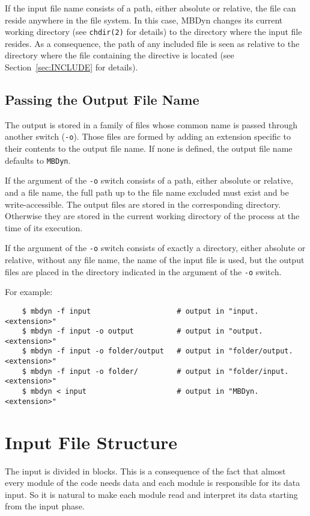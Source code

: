 If the input file name consists of a path, either absolute or relative,
the file can reside anywhere in the file system.
In this case, MBDyn changes its current working directory
(see \texttt{chdir(2)} for details)
to the directory where the input file resides.
As a consequence, the path of any included file is seen as relative
to the directory where the file containing the  directive
is located (see Section~\ref{sec:INCLUDE} for details).



\subsection{Passing the Output File Name}
The output is stored in a family of files whose common name is passed
through another switch (\texttt{-o}).
Those files are formed by adding an extension specific to their contents
to the output file name.
If none is defined, the output file name defaults to \texttt{MBDyn}.

If the argument of the \texttt{-o} switch consists of a path,
either absolute or relative, and a file name,
the full path up to the file name excluded must exist and be write-accessible.
The output files are stored in the corresponding directory.
Otherwise they are stored in the current working directory of the process
at the time of its execution.

If the argument of the \texttt{-o} switch consists of exactly a directory,
either absolute or relative, without any file name,
the name of the input file is used,
but the output files are placed in the directory indicated in the argument
of the \texttt{-o} switch.

For example:
\begin{verbatim}
    $ mbdyn -f input                    # output in "input.<extension>"
    $ mbdyn -f input -o output          # output in "output.<extension>"
    $ mbdyn -f input -o folder/output   # output in "folder/output.<extension>"
    $ mbdyn -f input -o folder/         # output in "folder/input.<extension>"
    $ mbdyn < input                     # output in "MBDyn.<extension>"
\end{verbatim}



\section{Input File Structure}
The input is divided in blocks.
This is a consequence of the fact that almost every module of the code 
needs data and each module is responsible for its data input. 
So it is natural to make each module read and interpret its data starting 
from the input phase.

